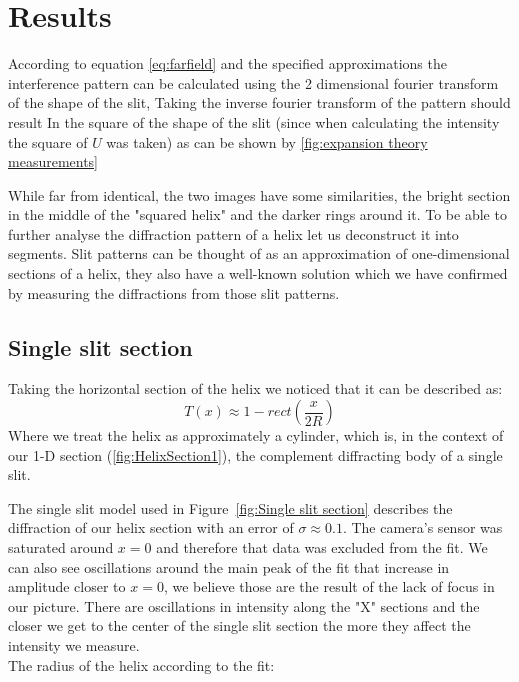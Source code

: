 \section{Results}\label{sec:results}
According to equation \eqref{eq:farfield} and the specified approximations the interference pattern can be calculated using
the 2 dimensional fourier transform of the shape of the slit, Taking the inverse fourier transform of the pattern should result
In the square of the shape of the slit (since when calculating the intensity the square of $U$ was taken)
as can be shown by \ref{fig:expansion theory measurements}


While far from identical, the two images have some similarities, the bright section in the middle of the "squared helix" and the darker rings around it.
To be able to further analyse the diffraction pattern of a helix let us deconstruct it into segments.
Slit patterns can be thought of as an approximation of one-dimensional sections of a helix, they also have a well-known solution which we have confirmed by measuring the diffractions from those slit patterns.



\subsection{Single slit section}
Taking the horizontal section of the helix we noticed that it can be described as:
\[T(x)\approx 1-rect\left(\frac{x}{2R}\right)\]
Where we treat the helix as approximately a cylinder, which is, in the context of our 1-D section (\ref{fig:HelixSection1}), the complement diffracting body of a single slit.

The single slit model used in Figure~\ref{fig:Single slit section} describes the diffraction of our helix section with an error of $\sigma\approx0.1$.
The camera's sensor was saturated around $x=0$ and therefore that data was excluded from the fit.
We can also see oscillations around the main peak of the fit that increase in amplitude closer to $x=0$, we believe those are the result of the lack of focus in our picture.
There are oscillations in intensity along the "X" sections and the closer we get to the center of the single slit section the more they affect the intensity we measure.
\\
The radius of the helix according to the fit:
\[\]

